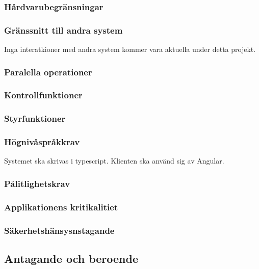 \documentclass{article}
\begin{document}
\begin{enumerate}
\subsubsection{Hårdvarubegränsningar}
\label{subsec:Hardvarubegransningar}
\subsubsection{Gränssnitt till andra system}
\label{subsec:Granssnitt till andra system}
Inga interatkioner med andra system kommer vara aktuella under detta projekt.
\subsubsection{Paralella operationer}
\label{subsec:Paralella operationer}
\subsubsection{Kontrollfunktioner}
\label{subsec:Kontrollfunktioner}
\subsubsection{Styrfunktioner}
\label{subsec:Styrfunktioner}
\subsubsection{Högnivåspråkkrav}
\label{subsec:Hognivasprakkrav}
Systemet ska skrivas i typescript. Klienten ska använd sig av Angular.
\subsubsection{Pålitlighetskrav}
\label{subsec:Palitlighetskrav}
\subsubsection{Applikationens kritikalitiet}
\label{subsec:Applikationens kritikalitiet}
\subsubsection{Säkerhetshänsysnstagande}
\label{subsec:Sakerhetshansysnstagande}

\subsection{Antagande och beroende}
\label{subsec:Antagande och beroende}


\end{enumerate}
\end{document}
